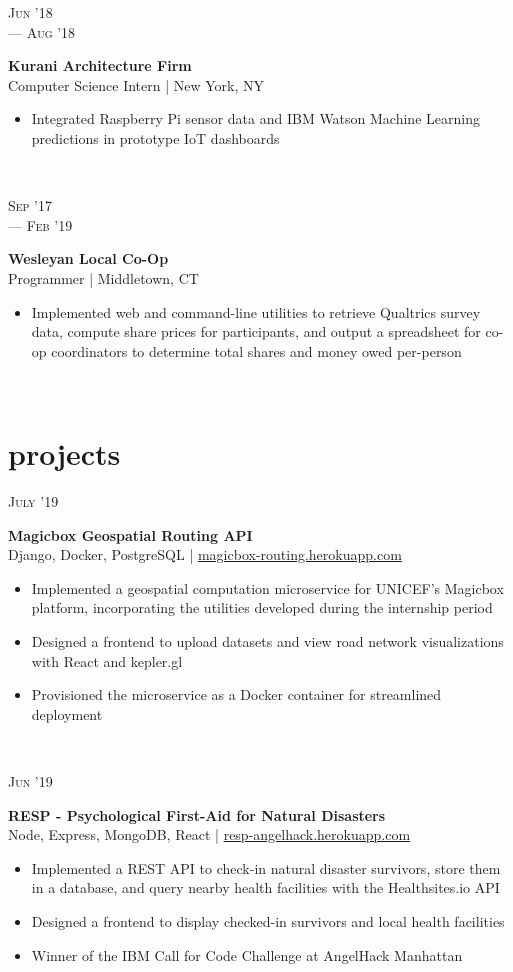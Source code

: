 \documentclass[letterpaper, 10.5pt]{article}
\newcommand{\expentry}[5]{
    \begin{minipage}[t]{.15\linewidth}
    \hfill \textsc{#1} \\
    \hfill \hspace*{5pt}\hfill --- \textsc{#2}
    \end{minipage}
    \hfill\vline\hfill
    \begin{minipage}[t]{.80\linewidth}
    {\bf\large#3}
    \\ #4 
    \vspace{-1.5mm}
    \small{#5}
    \end{minipage}\\
    \vspace{.10cm}
    }
\newcommand{\projectentry}[4]{
    \begin{minipage}[t]{.15\linewidth}
    \hfill \textsc{#1}
    \end{minipage}
    \hfill\vline\hfill
    \begin{minipage}[t]{.80\linewidth}
    {\bf#2}
    \\ #3 
    \vspace{-1.0mm}
    \small{#4}
    \end{minipage}\\
    \vspace{.10cm}
    }
\begin{document}
    \expentry{Jun '18}
    {Aug '18}
    {Kurani Architecture Firm}
    {Computer Science Intern | New York, NY}
    {\begin{itemize}
          \setlength\itemsep{0.1mm}
          \item Integrated Raspberry Pi sensor data and IBM Watson Machine Learning predictions in prototype IoT dashboards
        \end{itemize}
    }

    \expentry{Sep '17}
    {Feb '19}
    {Wesleyan Local Co-Op}
    {Programmer | Middletown, CT}
    {\begin{itemize}
          \setlength\itemsep{0.1mm}
          \item Implemented web and command-line utilities to retrieve Qualtrics survey data, compute share prices for participants, and output a spreadsheet for co-op coordinators to determine total shares and money owed per-person
        \end{itemize}
    }

    \section{projects}

        \projectentry{July '19}
            {Magicbox Geospatial Routing API}
            {Django, Docker, PostgreSQL | \href{https://magicbox-routing.herokuapp.com}{magicbox-routing.herokuapp.com}}
            {\begin{itemize}
                \setlength\itemsep{0.1mm}
                \item Implemented a geospatial computation microservice for UNICEF's Magicbox platform, incorporating the utilities developed during the internship period
                \item Designed a frontend to upload datasets and view road network visualizations with React and kepler.gl
                \item Provisioned the microservice as a Docker container for streamlined deployment
            \end{itemize}
            }

        \projectentry{Jun '19}
            {RESP - Psychological First-Aid for Natural Disasters}
            {Node, Express, MongoDB, React | \href{https://resp-angelhack.herokuapp.com}{resp-angelhack.herokuapp.com}}
            {\begin{itemize}
                \setlength\itemsep{0.1mm}
                \item Implemented a REST API to check-in natural disaster survivors, store them in a database, and query nearby health facilities with the Healthsites.io API
                \item Designed a frontend  to display checked-in survivors and local health facilities
                \item Winner of the IBM Call for Code Challenge at AngelHack Manhattan
            \end{itemize}
            }
            
\end{document}
